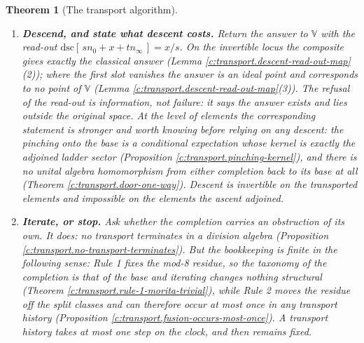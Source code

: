\documentclass[11pt]{article}
\newtheorem{theorem}{Theorem}[section]
\theoremstyle{definition}
\theoremstyle{plain}
\providecommand{\dsc}{}\renewcommand{\dsc}{\mathrm{dsc}}
\providecommand{\nInf}{}\renewcommand{\nInf}{n_\infty}
\providecommand{\nO}{}\renewcommand{\nO}{n_0}
\begin{document}
\begin{theorem}[The transport algorithm]
\begin{enumerate}
\item[\textbf{Step 5.}] \textbf{Descend, and state what descent costs.} Return the answer to $\mathbb{V}$ with the read-out $\dsc[\,s\nO + x + t\nInf\,] = x/s$. On the invertible locus the composite gives exactly the classical answer (Lemma \ref{c:transport.descent-read-out-map}(2)); where the first slot vanishes the answer is an ideal point and corresponds to no point of $\mathbb{V}$ (Lemma \ref{c:transport.descent-read-out-map}(3)). \emph{The refusal of the read-out is information, not failure}: it says the answer exists and lies outside the original space. At the level of elements the corresponding statement is stronger and worth knowing before relying on any descent: the pinching onto the base is a conditional expectation whose kernel is exactly the adjoined ladder sector (Proposition \ref{c:transport.pinching-kernel}), and there is no unital algebra homomorphism from either completion back to its base at all (Theorem \ref{c:transport.door-one-way}). Descent is invertible on the transported elements and impossible on the elements the ascent adjoined.

\item[\textbf{Step 6.}] \textbf{Iterate, or stop.} Ask whether the completion carries an obstruction of its own. It does: no transport terminates in a division algebra (Proposition \ref{c:transport.no-transport-terminates}). But the bookkeeping is finite in the following sense: Rule 1 fixes the mod-8 residue, so the taxonomy of the completion is that of the base and iterating changes nothing structural (Theorem \ref{c:transport.rule-1-morita-trivial}), while Rule 2 moves the residue off the split classes and can therefore occur at most once in any transport history (Proposition \ref{c:transport.fusion-occurs-most-once}). A transport history takes at most one step on the clock, and then remains fixed.
\end{enumerate}
\end{theorem}
\end{document}
